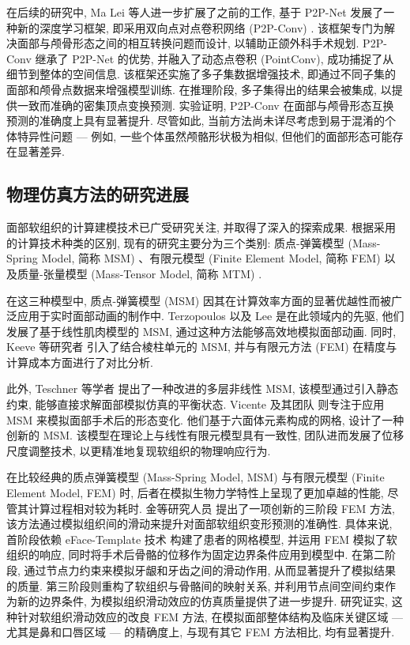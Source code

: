 在后续的研究中, Ma Lei 等人进一步扩展了之前的工作, 基于 P2P-Net \cite{yinP2PNETBidirectionalPoint2018} 发展了一种新的深度学习框架, 即采用双向点对点卷积网络 (P2P-Conv) \cite{maBidirectionalPredictionFacial2023}.
该框架专门为解决面部与颅骨形态之间的相互转换问题而设计, 以辅助正颌外科手术规划.
P2P-Conv 继承了 P2P-Net 的优势, 并融入了动态点卷积 (PointConv), 成功捕捉了从细节到整体的空间信息.
该框架还实施了多子集数据增强技术, 即通过不同子集的面部和颅骨点数据来增强模型训练.
在推理阶段, 多子集得出的结果会被集成, 以提供一致而准确的密集顶点变换预测.
实验证明, P2P-Conv 在面部与颅骨形态互换预测的准确度上具有显著提升.
尽管如此, 当前方法尚未详尽考虑到易于混淆的个体特异性问题 --- 例如, 一些个体虽然颅骼形状极为相似, 但他们的面部形态可能存在显著差异.

\subsection{物理仿真方法的研究进展}

面部软组织的计算建模技术已广受研究关注, 并取得了深入的探索成果.
根据采用的计算技术种类的区别, 现有的研究主要分为三个类别: 质点-弹簧模型 (Mass-Spring Model, 简称 MSM) 、有限元模型 (Finite Element Model, 简称 FEM) 以及质量-张量模型 (Mass-Tensor Model, 简称 MTM) .

在这三种模型中, 质点-弹簧模型 (MSM) 因其在计算效率方面的显著优越性而被广泛应用于实时面部动画的制作中.
Terzopoulos \cite{terzopoulosPhysicallyBasedFacial1990} 以及 Lee \cite{leeRealisticModelingFacial1995} 是在此领域内的先驱, 他们发展了基于线性肌肉模型的 MSM, 通过这种方法能够高效地模拟面部动画.
同时, Keeve 等研究者 \cite{keeveDeformableModelingFacial1998} 引入了结合棱柱单元的 MSM, 并与有限元方法 (FEM) 在精度与计算成本方面进行了对比分析.

此外, Teschner 等学者 \cite{teschnerDirectComputationNonlinear} 提出了一种改进的多层非线性 MSM, 该模型通过引入静态约束, 能够直接求解面部模拟仿真的平衡状态.
Vicente 及其团队 \cite{vicenteMaxillofacialSurgerySimulation2009} 则专注于应用 MSM 来模拟面部手术后的形态变化.
他们基于六面体元素构成的网格, 设计了一种创新的 MSM.
该模型在理论上与线性有限元模型具有一致性, 团队进而发展了位移尺度调整技术, 以更精准地复现软组织的物理响应行为.

在比较经典的质点弹簧模型 (Mass-Spring Model, MSM) 与有限元模型 (Finite Element Model, FEM) 时, 后者在模拟生物力学特性上呈现了更加卓越的性能, 尽管其计算过程相对较为耗时.
金等研究人员 \cite{kimClinicallyValidatedPrediction2017} 提出了一项创新的三阶段 FEM 方法, 该方法通过模拟组织间的滑动来提升对面部软组织变形预测的准确性.
具体来说, 首阶段依赖 eFace-Template 技术 \cite{zhangEFacetemplateMethodEfficiently2016} 构建了患者的网格模型, 并运用 FEM 模拟了软组织的响应, 同时将手术后骨骼的位移作为固定边界条件应用到模型中.
在第二阶段, 通过节点力约束来模拟牙龈和牙齿之间的滑动作用, 从而显著提升了模拟结果的质量.
第三阶段则重构了软组织与骨骼间的映射关系, 并利用节点间空间约束作为新的边界条件, 为模拟组织滑动效应的仿真质量提供了进一步提升.
研究证实, 这种针对软组织滑动效应的改良 FEM 方法, 在模拟面部整体结构及临床关键区域 --- 尤其是鼻和口唇区域 --- 的精确度上, 与现有其它 FEM 方法相比, 均有显著提升.

